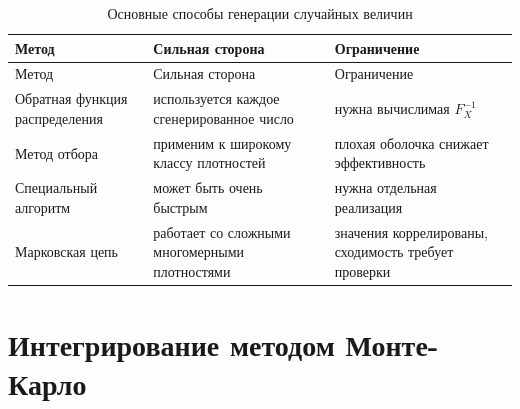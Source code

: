 \documentclass[
  russian,
  11pt,
  a4paper,
  open=any]{scrbook}
\begin{document}
\begin{longtable}[]{@{}
  >{\raggedright\arraybackslash}p{}
  >{\raggedright\arraybackslash}p{}
  >{\raggedright\arraybackslash}p{}@{}}
\caption{Основные способы генерации случайных
величин}\label{tbl-ch8-generation-methods}\tabularnewline
\toprule\noalign{}
\begin{minipage}[b]{\linewidth}\raggedright
Метод
\end{minipage} & \begin{minipage}[b]{\linewidth}\raggedright
Сильная сторона
\end{minipage} & \begin{minipage}[b]{\linewidth}\raggedright
Ограничение
\end{minipage} \\
\midrule\noalign{}
\endfirsthead
\toprule\noalign{}
\begin{minipage}[b]{\linewidth}\raggedright
Метод
\end{minipage} & \begin{minipage}[b]{\linewidth}\raggedright
Сильная сторона
\end{minipage} & \begin{minipage}[b]{\linewidth}\raggedright
Ограничение
\end{minipage} \\
\midrule\noalign{}
\endhead
\bottomrule\noalign{}
\endlastfoot
Обратная функция распределения & используется каждое сгенерированное
число & нужна вычислимая \(F_X^{-1}\) \\
Метод отбора & применим к широкому классу плотностей & плохая оболочка
снижает эффективность \\
Специальный алгоритм & может быть очень быстрым & нужна отдельная
реализация \\
Марковская цепь & работает со сложными многомерными плотностями &
значения коррелированы, сходимость требует проверки \\
\end{longtable}

\section{Интегрирование методом
Монте-Карло}\label{ux438ux43dux442ux435ux433ux440ux438ux440ux43eux432ux430ux43dux438ux435-ux43cux435ux442ux43eux434ux43eux43c-ux43cux43eux43dux442ux435-ux43aux430ux440ux43bux43e}
\end{document}
